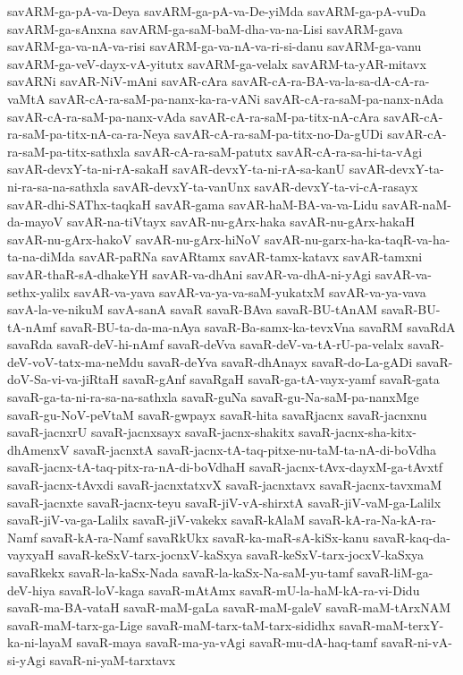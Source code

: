 {savARM-ga-pA-va-Deya
savARM-ga-pA-va-De-yiMda
savARM-ga-pA-vuDa
savARM-ga-sAnxna
savARM-ga-saM-baM-dha-va-na-Lisi
savARM-gava
savARM-ga-va-nA-va-risi
savARM-ga-va-nA-va-ri-si-danu
savARM-ga-vanu
savARM-ga-veV-dayx-vA-yitutx
savARM-ga-velalx
savARM-ta-yAR-mitavx
savARNi
savAR-NiV-mAni
savAR-cAra
savAR-cA-ra-BA-va-la-sa-dA-cA-ra-vaMtA
savAR-cA-ra-saM-pa-nanx-ka-ra-vANi
savAR-cA-ra-saM-pa-nanx-nAda
savAR-cA-ra-saM-pa-nanx-vAda
savAR-cA-ra-saM-pa-titx-nA-cAra
savAR-cA-ra-saM-pa-titx-nA-ca-ra-Neya
savAR-cA-ra-saM-pa-titx-no-Da-gUDi
savAR-cA-ra-saM-pa-titx-sathxla
savAR-cA-ra-saM-patutx
savAR-cA-ra-sa-hi-ta-vAgi
savAR-devxY-ta-ni-rA-sakaH
savAR-devxY-ta-ni-rA-sa-kanU
savAR-devxY-ta-ni-ra-sa-na-sathxla
savAR-devxY-ta-vanUnx
savAR-devxY-ta-vi-cA-rasayx
savAR-dhi-SAThx-taqkaH
savAR-gama
savAR-haM-BA-va-va-Lidu
savAR-naM-da-mayoV
savAR-na-tiVtayx
savAR-nu-gArx-haka
savAR-nu-gArx-hakaH
savAR-nu-gArx-hakoV
savAR-nu-gArx-hiNoV
savAR-nu-garx-ha-ka-taqR-va-ha-ta-na-diMda
savAR-paRNa
savARtamx
savAR-tamx-katavx
savAR-tamxni
savAR-thaR-sA-dhakeYH
savAR-va-dhAni
savAR-va-dhA-ni-yAgi
savAR-va-sethx-yalilx
savAR-va-yava
savAR-va-ya-va-saM-yukatxM
savAR-va-ya-vava
savA-la-ve-nikuM
savA-sanA
savaR
savaR-BAva
savaR-BU-tAnAM
savaR-BU-tA-nAmf
savaR-BU-ta-da-ma-nAya
savaR-Ba-samx-ka-tevxVna
savaRM
savaRdA
savaRda
savaR-deV-hi-nAmf
savaR-deVva
savaR-deV-va-tA-rU-pa-velalx
savaR-deV-voV-tatx-ma-neMdu
savaR-deYva
savaR-dhAnayx
savaR-do-La-gADi
savaR-doV-Sa-vi-va-jiRtaH
savaR-gAnf
savaRgaH
savaR-ga-tA-vayx-yamf
savaR-gata
savaR-ga-ta-ni-ra-sa-na-sathxla
savaR-guNa
savaR-gu-Na-saM-pa-nanxMge
savaR-gu-NoV-peVtaM
savaR-gwpayx
savaR-hita
savaRjacnx
savaR-jacnxnu
savaR-jacnxrU
savaR-jacnxsayx
savaR-jacnx-shakitx
savaR-jacnx-sha-kitx-dhAmenxV
savaR-jacnxtA
savaR-jacnx-tA-taq-pitxe-nu-taM-ta-nA-di-boVdha
savaR-jacnx-tA-taq-pitx-ra-nA-di-boVdhaH
savaR-jacnx-tAvx-dayxM-ga-tAvxtf
savaR-jacnx-tAvxdi
savaR-jacnxtatxvX
savaR-jacnxtavx
savaR-jacnx-tavxmaM
savaR-jacnxte
savaR-jacnx-teyu
savaR-jiV-vA-shirxtA
savaR-jiV-vaM-ga-Lalilx
savaR-jiV-va-ga-Lalilx
savaR-jiV-vakekx
savaR-kAlaM
savaR-kA-ra-Na-kA-ra-Namf
savaR-kA-ra-Namf
savaRkUkx
savaR-ka-maR-sA-kiSx-kanu
savaR-kaq-da-vayxyaH
savaR-keSxV-tarx-jocnxV-kaSxya
savaR-keSxV-tarx-jocxV-kaSxya
savaRkekx
savaR-la-kaSx-Nada
savaR-la-kaSx-Na-saM-yu-tamf
savaR-liM-ga-deV-hiya
savaR-loV-kaga
savaR-mAtAmx
savaR-mU-la-haM-kA-ra-vi-Didu
savaR-ma-BA-vataH
savaR-maM-gaLa
savaR-maM-galeV
savaR-maM-tArxNAM
savaR-maM-tarx-ga-Lige
savaR-maM-tarx-taM-tarx-sididhx
savaR-maM-terxY-ka-ni-layaM
savaR-maya
savaR-ma-ya-vAgi
savaR-mu-dA-haq-tamf
savaR-ni-vA-si-yAgi
savaR-ni-yaM-tarxtavx
}
